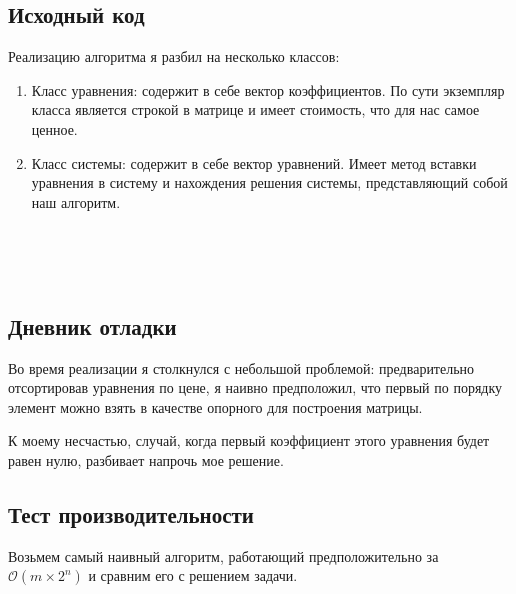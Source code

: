 \documentclass[12pt]{article}
\begin{document}
	\subsection*{Исходный код}
	Реализацию алгоритма я разбил на несколько классов:
	\begin{enumerate}
		\item Класс уравнения: содержит в себе вектор коэффициентов. По сути экземпляр класса является строкой в матрице и имеет стоимость, что для нас самое ценное.
		\item Класс системы: содержит в себе вектор уравнений. Имеет метод вставки уравнения в систему и нахождения решения системы, представляющий собой наш алгоритм.
	\end{enumerate}
	\noindent\makebox[\linewidth]{\rule{\paperwidth}{0.4pt}}
	\inputminted[breaklines]{C++}{../src/Equation.h}
	\vspace{5mm}
	\noindent\makebox[\linewidth]{\rule{\paperwidth}{0.4pt}}
	\inputminted[breaklines]{C++}{../src/Equation.cpp}
	\vspace{5mm}
	\noindent\makebox[\linewidth]{\rule{\paperwidth}{0.4pt}}
	
	\inputminted[breaklines]{C++}{../src/SystemOfEquations.h}
	\vspace{5mm}
	\noindent\makebox[\linewidth]{\rule{\paperwidth}{0.4pt}}
	
	\inputminted[breaklines]{C++}{../src/SystemOfEquations.cpp}
	\vspace{5mm}
	\noindent\makebox[\linewidth]{\rule{\paperwidth}{0.4pt}}
	
	\inputminted[breaklines]{C++}{../src/main.cpp}
	\newpage
	\subsection*{Дневник отладки}
	Во время реализации я столкнулся с небольшой проблемой: предварительно отсортировав уравнения по цене, я наивно предположил, что первый по порядку элемент можно взять в качестве опорного для построения матрицы.
	
	К моему несчастью, случай, когда первый коэффициент этого уравнения будет равен нулю, разбивает напрочь мое решение.


	\subsection*{Тест производительности}
	
	Возьмем самый наивный алгоритм, работающий предположительно за $\mathcal{O}(m \times 2^n)$ и сравним его с решением задачи.
	
\end{document}
